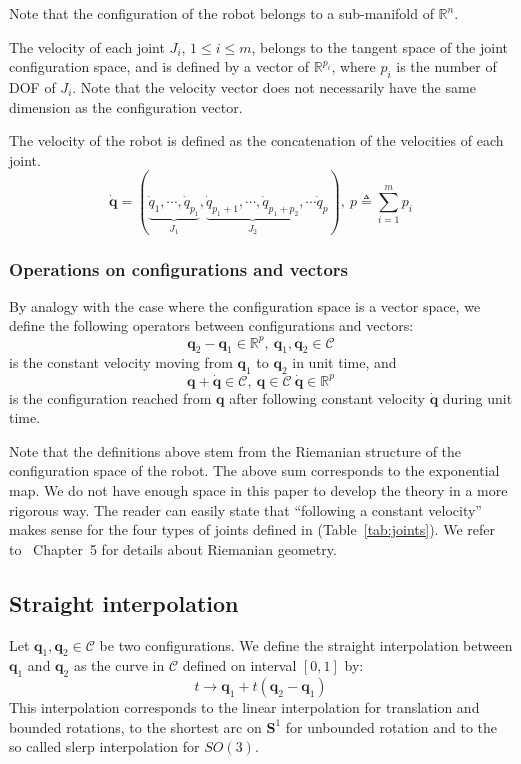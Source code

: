 \documentclass{tADR2e}
\newcommand\real{\mathbb{R}}
\newcommand\CS{\mathcal{C}}
\newcommand\Sone{\mathbf{S}^1}
\newcommand\conf{\mathbf{q}}
\begin{document}
Note that the configuration of the robot belongs to a sub-manifold of $\real^n$.

The velocity of each joint $J_i$, $1\leq i \leq m$,  belongs to the tangent space of 
the joint configuration space, and is defined by a vector of $\real^{p_i}$, where 
$p_i$ is the number of DOF of $J_i$. Note that
the velocity vector does not necessarily have the same dimension as the 
configuration vector.

The velocity of the robot is defined as the concatenation of the velocities of 
each joint.
$$\dot{\conf} = (\underbrace{\dot{q}_{1},\cdots,\dot{q}_{p_1}}_{J_1},
\underbrace{\dot{q}_{p_1+1},\cdots,\dot{q}_{p_1+p_2}}_{J_2},\cdots \dot{q}_p),\ p
\triangleq\sum_{i=1}^m p_i$$

\subsubsection{Operations on configurations and vectors}%
By analogy with the case 
where the configuration space is a vector space, we define the following 
operators between configurations and vectors:
$$
\conf_2 - \conf_1 \in \real^p, \ \conf_1, \conf_2\in\CS
$$
is the constant velocity moving from $\conf_1$ to $\conf_2$ in unit time, and
$$
\conf + \dot{\conf}\in\CS, \ \conf\in\CS \ \dot{\conf}\in\real^p
$$
is the configuration reached from $\conf$ after following constant velocity $
\dot{\conf}$ during unit time.

Note that the definitions above stem from the Riemanian structure of the 
configuration space of the robot. The above sum corresponds to the exponential 
map. We do not have enough space in this paper to develop the theory in a more 
rigorous way. The reader can easily state that ``following a 
constant velocity'' makes sense for the four types of joints defined in 
(Table~\ref{tab:joints}). We refer to~\cite{riemanian-optim2008} Chapter~5 for 
details about Riemanian geometry.

\subsection {Straight interpolation}

Let $\conf_1, \conf_2\in\CS$ be two configurations. We define the straight 
interpolation between $\conf_1$ and $\conf_2$ as the curve in $\CS$ defined on 
interval $[0,1]$ by:
$$
t \rightarrow \conf_1 + t (\conf_2 - \conf_1)
$$
This interpolation corresponds to the linear interpolation for translation and 
bounded rotations, to the shortest arc on $\Sone$ for unbounded rotation and to 
the so called slerp interpolation for $SO(3)$.
\end{document}
